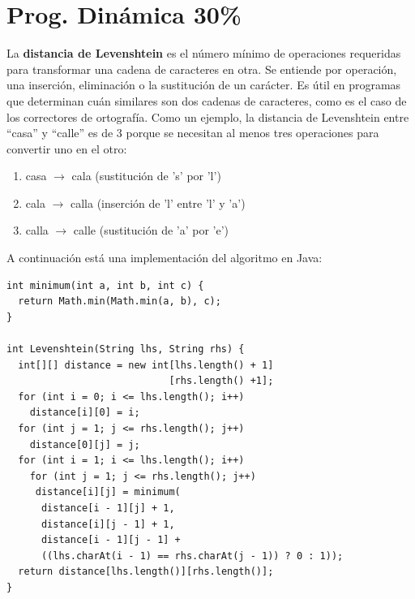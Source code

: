 \documentclass[twocolumn]{article}
\begin{document}
\section{Prog. Dinámica 30\%}

La \textbf{distancia de Levenshtein} es el número mínimo de operaciones requeridas para transformar una cadena de caracteres en otra. Se entiende por operación,  una inserción, eliminación o la sustitución de un carácter. Es útil en programas que determinan cuán similares son dos cadenas de caracteres, como es el caso de los correctores de ortografía. Como un ejemplo, la distancia de Levenshtein entre ``casa'' y ``calle'' es de $3$ porque se necesitan al menos tres operaciones para convertir uno en el otro:

\begin{enumerate}
   \item casa $\rightarrow$ cala (sustitución de 's' por 'l')
  \item  cala $\rightarrow$ calla (inserción de 'l' entre 'l' y 'a')
   \item calla $\rightarrow$ calle (sustitución de 'a' por 'e')
\end{enumerate}

A continuación está una implementación del algoritmo en Java:

{\small
\begin{verbatim}
int minimum(int a, int b, int c) {                            
  return Math.min(Math.min(a, b), c);                                      
}                                                                            
                                                                                
int Levenshtein(String lhs, String rhs) {      
  int[][] distance = new int[lhs.length() + 1]
                            [rhs.length() +1];                                   
  for (int i = 0; i <= lhs.length(); i++)                                 
    distance[i][0] = i;                                                  
  for (int j = 1; j <= rhs.length(); j++)                                 
    distance[0][j] = j;                                                                     
  for (int i = 1; i <= lhs.length(); i++)                                 
    for (int j = 1; j <= rhs.length(); j++)                             
     distance[i][j] = minimum(                                        
      distance[i - 1][j] + 1,                                  
      distance[i][j - 1] + 1,                                  
      distance[i - 1][j - 1] + 
      ((lhs.charAt(i - 1) == rhs.charAt(j - 1)) ? 0 : 1));                                                           
  return distance[lhs.length()][rhs.length()];                          
}                                                                            
\end{verbatim}
}
\end{document}
